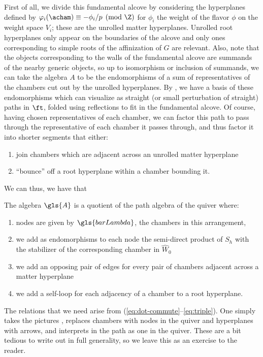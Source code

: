First of all, we divide this fundamental alcove by considering the hyperplanes defined by $\varphi_i(\acham)\equiv -\phi_i/p\pmod \Z$ for $\phi_i$ the weight of the flavor $\phi$ on the weight space $V_i$; these are the unrolled matter hyperplanes.  Unrolled root hyperplanes only appear on the boundaries of the alcove and only ones corresponding to simple roots of the affinization of $G$ are relevant.  Also, note that the objects corresponding to the walls of the fundamental alcove are summands of the nearby generic objects, so up to isomorphism or inclusion of summands, we can take the algebra $A$ to be the endomorphisms of a sum of representatives of the chambers cut out by the unrolled hyperplanes.  By \cite[Cor. 3.13]{WebSD}, we have a basis of these endomorphisms which can visualize as straight (or small perturbation of straight) paths in $\ft$, folded using reflections to fit in the fundamental alcove.  Of course, having chosen representatives of each chamber, we can factor this path to pass through the representative of each chamber it passes through, and thus factor it into shorter segments that either:
\begin{enumerate}
	\item join chambers which are adjacent across an unrolled matter hyperplane
	\item ``bounce'' off a root hyperplane within a chamber bounding it.  
\end{enumerate}  
We can thus, we have that
\begin{proposition}\label{prop:presentation}
The algebra $\gls{A}$ is a quotient of the path algebra of the quiver where:
\begin{enumerate}
	\item  nodes are given by $\gls{barLambda}$, the chambers in this arrangement,
	\item  we add as endomorphisms to each node the semi-direct product of $S_h$ with the stabilizer of the corresponding chamber in $\widehat{W}_0$
	\item we add an opposing pair of edges for every pair of chambers adjacent across a matter hyperplane 
	\item we add a self-loop for each adjacency of a chamber to a root hyperplane.
\end{enumerate}
\end{proposition}
The relations that we need arise from (\ref{eq:dot-commute}--\ref{eq:triple}).   One simply takes the pictures \cite[(2.5a--c)]{WebSD}, replaces chambers with nodes in the quiver and hyperplanes with arrows, and interprets in the path as one in the quiver. These are a bit tedious to write out in full generality, so we leave this as an exercise to the reader.   
